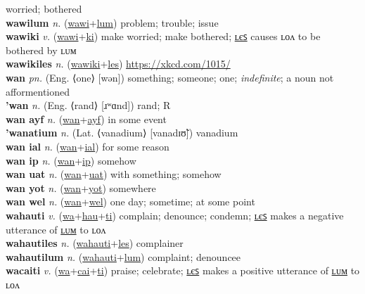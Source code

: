 worried; bothered \label{wawilon} \\
\textbf{wawilum} \textit{n.} (\hyperref[wawi]{wawi}+\hyperref[lum]{lum})
problem; trouble; issue \label{wawilum} \\
\textbf{wawiki} \textit{v.} (\hyperref[wawi]{wawi}+\hyperref[ki]{ki})
make worried; make bothered; \hyperref[wawikiles]{ʟєꜱ} causes ʟᴏᴧ to be bothered by ʟᴜᴍ \label{wawiki} \\
\textbf{wawikiles} \textit{n.} (\hyperref[wawiki]{wawiki}+\hyperref[les]{les})
\url{https://xkcd.com/1015/} \label{wawikiles} \\
\textbf{wan} \textit{pn.} (Eng. ⟨one⟩ [wən])
something; someone; one; \textit{indefinite}; a noun not afformentioned \label{wan} \\
\textbf{'wan} \textit{n.} (Eng. ⟨rand⟩ [ɹʷɑnd])
rand; R \label{'wan} \\
\textbf{wan ayf} \textit{n.} (\hyperref[wan]{wan}+\hyperref[ayf]{ayf})
in some event \label{wan ayf} \\
\textbf{'wanatium} \textit{n.} (Lat. ⟨vanadium⟩ [vanadɪʊ̃])
vanadium \label{'wanatium} \\
\textbf{wan ial} \textit{n.} (\hyperref[wan]{wan}+\hyperref[ial]{ial})
for some reason \label{wan ial} \\
\textbf{wan ip} \textit{n.} (\hyperref[wan]{wan}+\hyperref[ip]{ip})
somehow \label{wan ip} \\
\textbf{wan uat} \textit{n.} (\hyperref[wan]{wan}+\hyperref[uat]{uat})
with something; somehow \label{wan uat} \\
\textbf{wan yot} \textit{n.} (\hyperref[wan]{wan}+\hyperref[yot]{yot})
somewhere \label{wan yot} \\
\textbf{wan wel} \textit{n.} (\hyperref[wan]{wan}+\hyperref[wel]{wel})
one day; sometime; at some point \label{wan wel} \\
\textbf{wahauti} \textit{v.} (\hyperref[wa]{wa}+\hyperref[hau]{hau}+\hyperref[ti]{ti})
complain; denounce; condemn; \hyperref[wahautiles]{ʟєꜱ} makes a negative utterance of \hyperref[wahautilum]{ʟᴜᴍ} to ʟᴏᴧ \label{wahauti} \\
\textbf{wahautiles} \textit{n.} (\hyperref[wahauti]{wahauti}+\hyperref[les]{les})
complainer \label{wahautiles} \\
\textbf{wahautilum} \textit{n.} (\hyperref[wahauti]{wahauti}+\hyperref[lum]{lum})
complaint; denouncee \label{wahautilum} \\
\textbf{wacaiti} \textit{v.} (\hyperref[wa]{wa}+\hyperref[cai]{cai}+\hyperref[ti]{ti})
praise; celebrate; \hyperref[wacaitiles]{ʟєꜱ} makes a positive utterance of \hyperref[wacaitilum]{ʟᴜᴍ} to ʟᴏᴧ \label{wacaiti} \\
